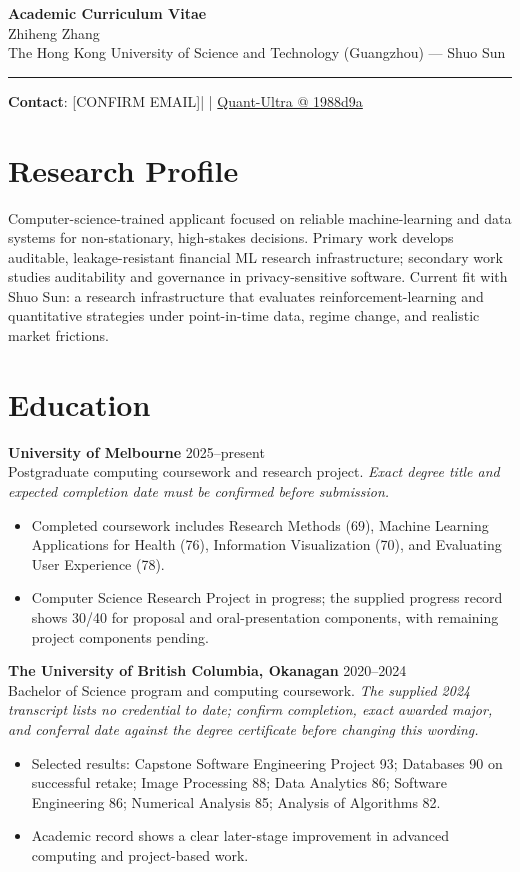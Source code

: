 \documentclass[11pt]{article}
\makeatletter
\newcommand{\ApplicantName}{Zhiheng Zhang}
\newcommand{\ApplicantEmail}{[CONFIRM EMAIL]}
\newcommand{\ApplicantPhone}{[CONFIRM PHONE]}
\newcommand{\ApplicantGitHub}{\href{https://github.com/zhiheng-zhang-Mera/Quant-Ultra/tree/1988d9a8530da91a8158de864d098ea869098923}{Quant-Ultra @ 1988d9a}}
\makeatother
\begin{document}
\begin{center}
{\LARGE\bfseries Academic Curriculum Vitae}\\[0.25em]
{\large \ApplicantName}\\
The Hong Kong University of Science and Technology (Guangzhou) --- Shuo Sun
\end{center}
\vspace{0.35em}\hrule\vspace{0.65em}

\textbf{Contact}: \ApplicantEmail\quad | \quad \ApplicantPhone\quad | \quad \ApplicantGitHub

\section*{Research Profile}
Computer-science-trained applicant focused on reliable machine-learning and data systems for non-stationary, high-stakes decisions. Primary work develops auditable, leakage-resistant financial ML research infrastructure; secondary work studies auditability and governance in privacy-sensitive software. Current fit with Shuo Sun: a research infrastructure that evaluates reinforcement-learning and quantitative strategies under point-in-time data, regime change, and realistic market frictions.

\section*{Education}
\textbf{University of Melbourne} \hfill 2025--present\\
Postgraduate computing coursework and research project. \textit{Exact degree title and expected completion date must be confirmed before submission.}
\begin{itemize}
\item Completed coursework includes Research Methods (69), Machine Learning Applications for Health (76), Information Visualization (70), and Evaluating User Experience (78).
\item Computer Science Research Project in progress; the supplied progress record shows 30/40 for proposal and oral-presentation components, with remaining project components pending.
\end{itemize}

\textbf{The University of British Columbia, Okanagan} \hfill 2020--2024\\
Bachelor of Science program and computing coursework. \textit{The supplied 2024 transcript lists no credential to date; confirm completion, exact awarded major, and conferral date against the degree certificate before changing this wording.}
\begin{itemize}
\item Selected results: Capstone Software Engineering Project 93; Databases 90 on successful retake; Image Processing 88; Data Analytics 86; Software Engineering 86; Numerical Analysis 85; Analysis of Algorithms 82.
\item Academic record shows a clear later-stage improvement in advanced computing and project-based work.
\end{itemize}
\end{document}
